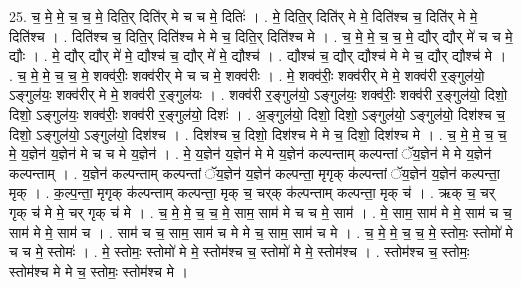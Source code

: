 \documentclass[17pt]{extarticle}
\begin{document}
25. च॒ मे॒ मे॒ च॒ च॒ मे॒ दिति॒र् दिति॑र् मे च च मे॒ दितिः॑ । . मे॒ दिति॒र् दिति॑र् मे मे॒ दिति॑श्च च॒ दिति॑र् मे मे॒ दिति॑श्च । . दिति॑श्च च॒ दिति॒र् दिति॑श्च मे मे च॒ दिति॒र् दिति॑श्च मे । . च॒ मे॒ मे॒ च॒ च॒ मे॒ द्यौर् द्यौर् मे॑ च च मे॒ द्यौः । . मे॒ द्यौर् द्यौर् मे॑ मे॒ द्यौश्च॑ च॒ द्यौर् मे॑ मे॒ द्यौश्च॑ । . द्यौश्च॑ च॒ द्यौर् द्यौश्च॑ मे मे च॒ द्यौर् द्यौश्च॑ मे । . च॒ मे॒ मे॒ च॒ च॒ मे॒ शक्व॑रीः॒ शक्व॑रीर् मे च च मे॒ शक्व॑रीः । . मे॒ शक्व॑रीः॒ शक्व॑रीर् मे मे॒ शक्व॑री र॒ङ्गुल॑यो॒ ऽङ्गुल॑यः॒ शक्व॑रीर् मे मे॒ शक्व॑री र॒ङ्गुल॑यः । . शक्व॑री र॒ङ्गुल॑यो॒ ऽङ्गुल॑यः॒ शक्व॑रीः॒ शक्व॑री र॒ङ्गुल॑यो॒ दिशो॒ दिशो॒ ऽङ्गुल॑यः॒ शक्व॑रीः॒ शक्व॑री र॒ङ्गुल॑यो॒ दिशः॑ । . अ॒ङ्गुल॑यो॒ दिशो॒ दिशो॒ ऽङ्गुल॑यो॒ ऽङ्गुल॑यो॒ दिश॑श्च च॒ दिशो॒ ऽङ्गुल॑यो॒ ऽङ्गुल॑यो॒ दिश॑श्च । . दिश॑श्च च॒ दिशो॒ दिश॑श्च मे मे च॒ दिशो॒ दिश॑श्च मे । . च॒ मे॒ मे॒ च॒ च॒ मे॒ य॒ज्ञेन॑ य॒ज्ञेन॑ मे च च मे य॒ज्ञेन॑ । . मे॒ य॒ज्ञेन॑ य॒ज्ञेन॑ मे मे य॒ज्ञेन॑ कल्पन्ताम् कल्पन्तां ॅय॒ज्ञेन॑ मे मे य॒ज्ञेन॑ कल्पन्ताम् । . य॒ज्ञेन॑ कल्पन्ताम् कल्पन्तां ॅय॒ज्ञेन॑ य॒ज्ञेन॑ कल्पन्ता॒ मृगृक् क॑ल्पन्तां ॅय॒ज्ञेन॑ य॒ज्ञेन॑ कल्पन्ता॒ मृक् । . क॒ल्प॒न्ता॒ मृगृक् क॑ल्पन्ताम् कल्पन्ता॒ मृक् च॒ चर्‌क् क॑ल्पन्ताम् कल्पन्ता॒ मृक् च॑ । . ऋक् च॒ चर्‌ गृक् च॑ मे मे॒ चर्‌ गृक् च॑ मे । . च॒ मे॒ मे॒ च॒ च॒ मे॒ साम॒ साम॑ मे च च मे॒ साम॑ । . मे॒ साम॒ साम॑ मे मे॒ साम॑ च च॒ साम॑ मे मे॒ साम॑ च । . साम॑ च च॒ साम॒ साम॑ च मे मे च॒ साम॒ साम॑ च मे । . च॒ मे॒ मे॒ च॒ च॒ मे॒ स्तोमः॒ स्तोमो॑ मे च च मे॒ स्तोमः॑ । . मे॒ स्तोमः॒ स्तोमो॑ मे मे॒ स्तोम॑श्च च॒ स्तोमो॑ मे मे॒ स्तोम॑श्च । . स्तोम॑श्च च॒ स्तोमः॒ स्तोम॑श्च मे मे च॒ स्तोमः॒ स्तोम॑श्च मे । \newline
\end{document}
